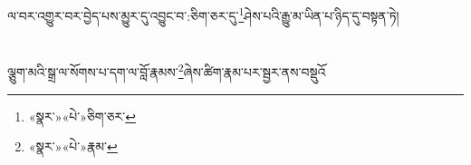 ལ་བར་འགྱུར་བར་བྱེད་པས་མྱུར་དུ་འབྱུང་བ་:ཅིག་ཅར་དུ་\footnote{«སྣར་»«པེ་»ཅིག་ཅར་}ཤེས་པའི་རྒྱུ་མ་ཡིན་པ་ཉིད་དུ་བསྟན་ཏེ།\chapter{ }ལྕུག་མའི་སྒྲ་ལ་སོགས་པ་དག་ལ་བློ་རྣམས་\footnote{«སྣར་»«པེ་»རྣམ་}ཞེས་ཚིག་རྣམ་པར་སྦྱར་ནས་བསྡུའོ